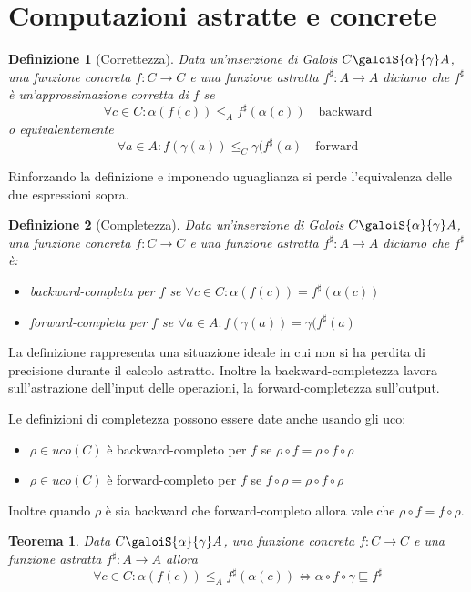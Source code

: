 \documentclass[a4paper, 10pt]{book}
\newtheorem{definit}{Definizione}[subsection]
\newtheorem{thm}{Teorema}[subsection]
\begin{document}
	\section{Computazioni astratte e concrete}
	\begin{definit}[Correttezza]
		Data un'inserzione di Galois $C \galoiS{\alpha}{\gamma} A$, una funzione concreta $f: C \to C$ e una funzione astratta $f^\sharp: A \to A$ diciamo che $f^\sharp$ è un'approssimazione corretta di $f$ se \[ \forall c \in C: \alpha(f(c)) \leq_A f^\sharp(\alpha(c)) \quad \text{backward} \] o equivalentemente \[ \forall a \in A: f(\gamma(a)) \leq_C \gamma(f^\sharp(a) \quad \text{forward} \]
	\end{definit}
	
	Rinforzando la definizione e imponendo uguaglianza si perde l'equivalenza delle due espressioni sopra. 
	\begin{definit}[Completezza]
		Data un'inserzione di Galois $C \galoiS{\alpha}{\gamma} A$, una funzione concreta $f: C \to C$ e una funzione astratta $f^\sharp: A \to A$ diciamo che $f^\sharp$ è: \begin{itemize}
			\item backward-completa per $f$ se  $\forall c \in C: \alpha(f(c)) = f^\sharp(\alpha(c))$
			\item forward-completa per $f$ se $\forall a \in A: f(\gamma(a)) = \gamma(f^\sharp(a)$
		\end{itemize}
	\end{definit}
	
	La definizione rappresenta una situazione ideale in cui non si ha perdita di precisione durante il calcolo astratto. Inoltre la backward-completezza lavora sull'astrazione dell'input delle operazioni, la forward-completezza sull'output.
	
	Le definizioni di completezza possono essere date anche usando gli uco: \begin{itemize}
		\item $\rho \in uco(C)$ è backward-completo per $f$ se $\rho \circ f = \rho \circ f \circ \rho$
		\item $\rho \in uco(C)$ è forward-completo per $f$ se $f \circ \rho = \rho \circ f \circ \rho$
	\end{itemize}

	Inoltre quando $\rho$ è sia backward che forward-completo allora vale che $\rho \circ f = f \circ \rho$.
	
	\begin{thm}
		Data $C \galoiS{\alpha}{\gamma} A$, una funzione concreta $f : C \to C$  e una funzione astratta $f^\sharp: A \to A$ allora  \[ \forall c \in C: \alpha(f(c)) \leq_A f^\sharp(\alpha(c)) \Leftrightarrow \alpha \circ f \circ \gamma \sqsubseteq f^\sharp \]
	\end{thm}
\end{document}
